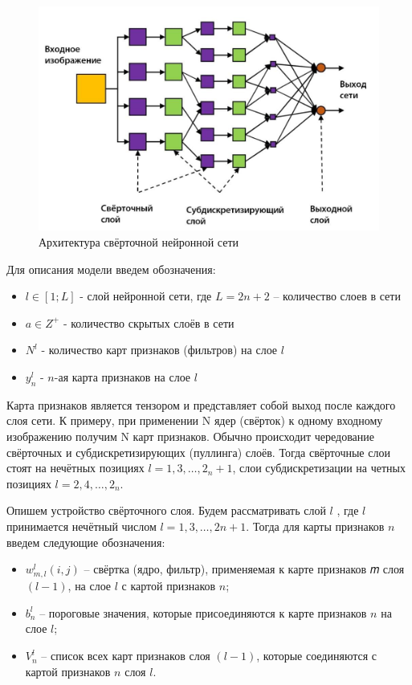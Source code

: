 \begin{itemize}
\begin{itemize}
\begin{figure}[h]
\includegraphics[width=0.75\columnwidth]{./img/recur_6.jpg}
\centering
\caption{Архитектура свёрточной нейронной сети}
\label{pic:recur_6}
\end{figure}

Для описания модели введем обозначения:
\begin{itemize}
  \item $l \in \left[1;L\right]$ - слой нейронной сети, где $L=2n+2$ – количество слоев в сети
  \item $a \in Z^{+}$ - количество скрытых слоёв в сети
  \item $N^l$ - количество карт признаков (фильтров) на слое $l$
  \item $y_n^l$ - $n$-ая карта признаков на слое $l$
\end{itemize}

Карта признаков является тензором и представляет собой выход после каждого слоя сети. 
К примеру, при применении N ядер (свёрток) к одному входному изображению получим N карт признаков. 
Обычно происходит чередование свёрточных и субдискретизирующих (пуллинга) слоёв. 
Тогда свёрточные слои стоят на нечётных позициях $l=1,3,…,2_n+1$, слои субдискретизации на четных позициях $l=2,4,…,2_n$.

Опишем устройство свёрточного слоя. Будем рассматривать слой $l$
, где $l$ принимается нечётный числом $l=1,3,…,2n+1$. Тогда для карты признаков $n$ введем следующие обозначения:

\begin{itemize}
  \item $w_{m,l}^l(i,j)$ – свёртка (ядро, фильтр), применяемая к карте признаков 𝑚 слоя $(l-1)$, на слое $l$ с картой признаков $n$;
  \item $b_n^l$ – пороговые значения, которые присоединяются к карте признаков $n$ на слое $l$;
  \item $V_n^l$ – список всех карт признаков слоя $(l-1)$, которые соединяются с картой признаков $n$ слоя $l$.
\end{itemize}


\end{itemize}
\end{itemize}
